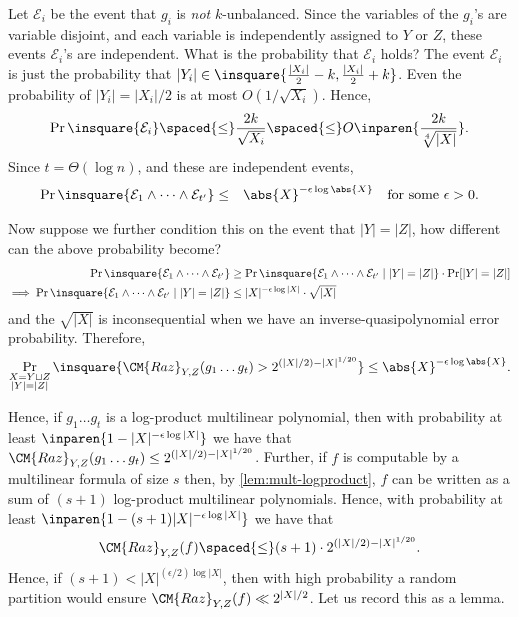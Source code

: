 Let $\mathcal{E}_i$ be the event that $g_i$ is \emph{not} $k$-unbalanced.
Since the variables of the $g_i$'s are variable disjoint, and each variable is independently assigned to $Y$ or $Z$, these events $\mathcal{E}_i$'s are independent. What is the probability that $\mathcal{E}_i$ holds? 
The event $\mathcal{E}_i$ is just the probability that  $|Y_i| \in \insquare{\frac{|X_i|}{2} -k , \frac{|X_i|}{2} +k}$. Even the probability of $|Y_i| = |X_i|/2$ is at most $O(1/\sqrt{X_i})$. Hence,
\[
  \Pr\insquare{\mathcal{E}_i} \spaced{\leq} \frac{2k}{\sqrt{X_i}} \spaced{\leq} O\inparen{\frac{2k}{\sqrt[4]{|X|}}}.
\]
Since $t = \Theta(\log n)$, and these are independent events, 
\begin{eqnarray*}
  \Pr\insquare{\mathcal{E}_1\wedge \dots \wedge \mathcal{E}_{t'}} & \leq & \abs{X}^{-\epsilon \log \abs{X}} \quad\text{for some $\epsilon > 0$}.
\end{eqnarray*}

Now suppose we further condition this on the event that $|Y| = |Z|$, how different can the above probability become?
\begin{align*}
  \Pr\insquare{\mathcal{E}_1\wedge \dots \wedge \mathcal{E}_{t'}} & \geq  \Pr\insquare{\mathcal{E}_1\wedge \dots \wedge \mathcal{E}_{t'} \mid |Y| = |Z|} \cdot \Pr[|Y| = |Z|]\\
  \implies \Pr\insquare{\mathcal{E}_1\wedge \dots \wedge \mathcal{E}_{t'} \mid |Y| = |Z|} & \leq |X|^{-\epsilon \log |X|} \cdot \sqrt{|X|}
\end{align*}
and the $\sqrt{|X|}$ is inconsequential when we have an inverse-quasipolynomial error probability.
Therefore,
\[
 \Pr_{\substack{X = Y\sqcup Z\\|Y| = |Z|}}\insquare{\CM{Raz}_{Y,Z}(g_1\dots g_t) > 2^{(|X|/2) - |X|^{1/20}}}  \leq  \abs{X}^{-\epsilon \log \abs{X}}.
\]

Hence, if $g_1\dots g_t$ is a log-product multilinear polynomial, 
then with probability at least $\inparen{1 - |X|^{-\epsilon \log |X|}}$ 
we have that $\CM{Raz}_{Y,Z}(g_1\dots g_t) \leq 2^{(|X|/2) - |X|^{1/20}}$. 
Further, if $f$ is computable by a multilinear formula of size $s$ then, 
by \autoref{lem:mult-logproduct}, $f$ can be written as a sum of 
$(s+1)$ log-product multilinear polynomials. 
Hence, with probability 
at least $\inparen{1 - (s+1)|X|^{-\epsilon \log |X|}}$ we have that
$$\CM{Raz}_{Y,Z}(f) \spaced{\leq} (s+1) \cdot 2^{(|X|/2) - |X|^{1/20}}. $$
Hence, if $(s+1) < |X|^{(\epsilon/2) \log |X|}$, then with high 
probability a random partition would ensure 
$\CM{Raz}_{Y,Z}(f) \ll 2^{|X|/2}$. 
Let us record this as a lemma.


